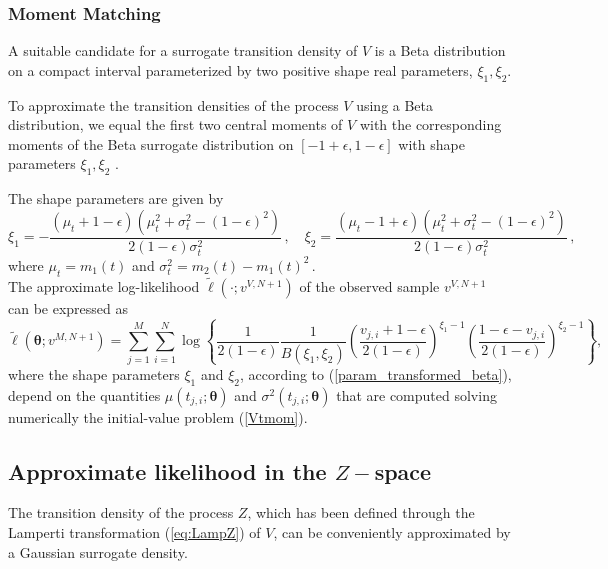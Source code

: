 \documentclass[11pt]{article}
\theoremstyle{definition}
\begin{document}
\subsubsection{Moment Matching}
A suitable candidate for a surrogate transition density of $V$ is a Beta distribution on a compact interval parameterized by two positive shape real parameters, $\xi_1, \xi_2$. 

To approximate the transition densities of  the process $V$ using a Beta distribution, we equal the first two central moments of $V$ with the corresponding moments of the Beta surrogate distribution on $[-1 + \epsilon,1 - \epsilon]$ with shape parameters $\xi_1, \xi_2$ . 

The shape parameters are given by
\begin{equation}
\xi_1 = - \frac{(\mu_t + 1 - \epsilon)(\mu_t^2 + \sigma_t^2 - (1- \epsilon)^2)}{2 (1 - \epsilon) \sigma_t^2}\,, \quad \xi_2=  \frac{(\mu_t-1 + \epsilon )(\mu_t^2 + \sigma_t^2 - (1- \epsilon)^2)}{2 (1 - \epsilon) \sigma_t^2} \,, \label{param_transformed_beta}
\end{equation}
where $\mu_t = m_1 (t)$ and $\sigma_t^2= m_2 (t)- m_1 (t)^2\,.$ \\

The approximate log-likelihood $\tilde{\ell}(\cdot ; v^{V, N+1})$ of the observed sample $v^{V, N+1}$ can be expressed as 
\begin{equation}
 \tilde{\ell} \left(\bm{\theta}; v^{M,N +1}\right) = \sum_{j=1}^M \sum_{i=1}^N \log  \left\{ \frac{1}{2(1 - \epsilon)} \frac{1}{B(\xi_1, \xi_2)} \left( \frac{v_{j,i} + 1 - \epsilon}{2(1 - \epsilon)} \right)^{\xi_1 -1}  \left( \frac{1 - \epsilon - v_{j,i}}{2(1 - \epsilon)} \right)^{\xi_2 -1} \right\},
\label{eq:loglikelihoodV}
\end{equation}
where the shape parameters $\xi_1$ and $\xi_2$, according to (\ref{param_transformed_beta}), depend on the quantities $\mu(t_{j,i};\bm{\theta} )$ and $\sigma^2(t_{j,i};\bm{\theta} )$ that are computed solving numerically the initial-value problem (\ref{Vtmom}). 

\subsection{Approximate likelihood  in the $Z-$space}

The transition density of the process $Z$, which has been defined through the Lamperti transformation (\ref{eq:LampZ}) of $V$, can be conveniently approximated by a Gaussian surrogate density. 
\end{document}
